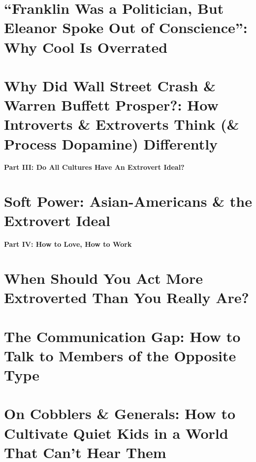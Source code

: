 \documentclass{article}
\numberwithin{equation}{section}
\begin{document}

\section{``Franklin Was a Politician, But Eleanor Spoke Out of Conscience'': Why Cool Is Overrated}


\section{Why Did Wall Street Crash \& Warren Buffett Prosper?: How Introverts \& Extroverts Think (\& Process Dopamine) Differently}


\begin{center}\LARGE\sf
	\textbf{Part III: Do All Cultures Have An Extrovert Ideal?}
\end{center}

\section{Soft Power: Asian-Americans \& the Extrovert Ideal}


\begin{center}\LARGE\sf
	\textbf{Part IV: How to Love, How to Work}
\end{center}

\section{When Should You Act More Extroverted Than You Really Are?}


\section{The Communication Gap: How to Talk to Members of the Opposite Type}


\section{On Cobblers \& Generals: How to Cultivate Quiet Kids in a World That Can't Hear Them}
\end{document}
